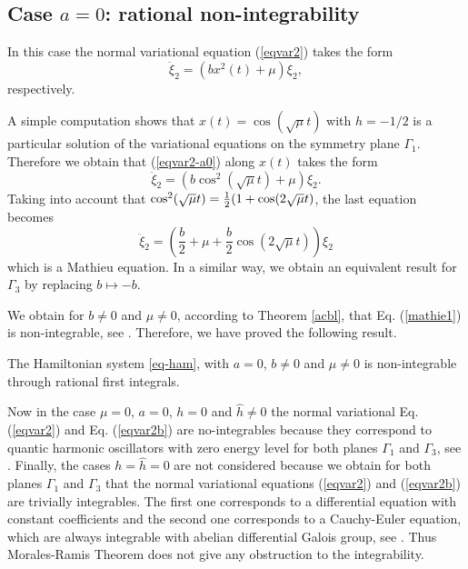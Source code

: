 \documentclass[final]{siamart0516}
\begin{document}
 \subsection{Case $a=0$: rational non-integrability}
 In this case the normal variational equation  (\ref{eqvar2})  takes the form
\begin{equation}\label{eqvar2-a0}
\ddot\xi_2=\left(bx^2(t)+\mu\right)\xi_2,\end{equation} 
respectively.


A simple computation shows that  $x(t)=\cos(\sqrt{\mu}t)$ with $h= -1/2$ is a particular solution of the variational equations on the symmetry plane $\Gamma_1$.
Therefore we  obtain that (\ref{eqvar2-a0}) along  $x(t)$ takes the form
$$\ddot\xi_2=\left(b\cos^2(\sqrt{\mu}t)+\mu\right)\xi_2.$$
Taking into account that $\cos^2(\sqrt{\mu}t)={1\over2}(1+\cos(2\sqrt{\mu}t)$,  the last equation  becomes
\begin{equation}\label{mathie1}
\ddot\xi_2=\left(\frac{b}{2}+\mu +\frac{b}{2}\cos(2\sqrt{\mu}t) \right)\xi_2\end{equation}     
which is a Mathieu equation.   
In a similar way, we obtain an equivalent result for $\Gamma_3$ by replacing $b \mapsto -b$.

 We obtain for $b\neq 0$ and $\mu\neq 0$, according to Theorem \ref{acbl}, that Eq. (\ref{mathie1}) 
 is non-integrable, see \cite{acbl}.
 Therefore,  we have proved the following result.
 \begin{theorem}
The Hamiltonian system \eqref{eq-ham}, with $a=0$, $b\neq 0$  and $\mu\neq 0$ 
is non-integrable through rational first integrals.
 \end{theorem}  

 Now in the case $\mu=0$, $a=0$, $h=0$ and $\hat{h}\neq 0$
 the normal variational Eq. (\ref{eqvar2}) and Eq. (\ref{eqvar2b}) are no-integrables 
 because they correspond to quantic harmonic oscillators with zero energy level for both planes
 $\Gamma_1$ and $\Gamma_3$, see
 \cite{acbl,acmowe}. Finally, the cases $h=\hat{h}=0$ are not considered because we obtain for both planes
 $\Gamma_1$ and $\Gamma_3$ that the normal variational equations (\ref{eqvar2}) and  (\ref{eqvar2b}) are trivially integrables. The first one corresponds to a differential equation with constant coefficients and the second one corresponds to a Cauchy-Euler equation, which are always integrable with abelian differential Galois group, 
 see \cite{acbook,acmowe}.
 Thus Morales-Ramis Theorem does not  give any obstruction to  the integrability.
\end{document}
